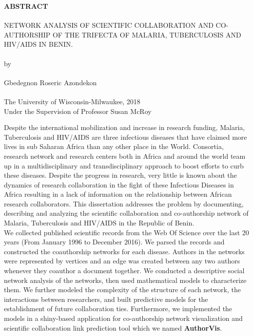 \clearpage
\pagestyle{plain}
\cfoot{\thepage}

\begin{center}
	\textbf{ABSTRACT}\\~\\
	\MakeUppercase{Network Analysis of Scientific Collaboration and Co-authorship of the Trifecta of Malaria, Tuberculosis and HIV/AIDS in Benin.}\\~\\
by\\~\\
Gbedegnon Roseric Azondekon\\~\\
The University of Wisconsin-Milwaukee, 2018\\
Under the Supervision of Professor Susan McRoy
\end{center}
    Despite the international mobilization and increase in research funding, Malaria, Tuberculosis and HIV/AIDS are three infectious diseases that have claimed more lives in sub Saharan Africa than any other place in the World. Consortia, research network and research centers both in Africa and around the world team up in a multidisciplinary and transdisciplinary approach to boost efforts to curb these diseases. Despite the progress in research, very little is known about the dynamics of research collaboration in the fight of these Infectious Diseases in Africa resulting in a lack of information on the relationship between African research collaborators. This dissertation addresses the problem by documenting, describing and analyzing the scientific collaboration and co-authorship network of Malaria, Tuberculosis and HIV/AIDS in the Republic of Benin.\\
    We collected published scientific records from the Web Of Science over the last 20 years (From January 1996 to December 2016). We parsed the records and constructed the coauthorship networks for each disease. Authors in the networks were represented by vertices and an edge was created between any two authors whenever they coauthor a document together. We conducted a descriptive social network analysis of the networks, then used mathematical models to characterize them. We further modeled the complexity of the structure of each network, the interactions between researchers, and built predictive models for the establishment of future collaboration ties. Furthermore, we implemented the models in a shiny-based application for co-authorship network visualization and scientific collaboration link prediction tool which we named \textbf{AuthorVis}.\\
